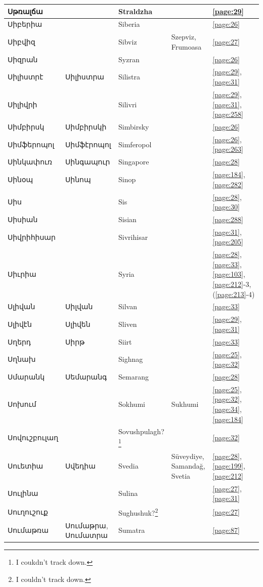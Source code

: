 \begin{center}
\begin{longtable}{|p{}|p{3cm}|p{3cm}|p{2cm}|p{3cm}|}
Սթռալճա& & Straldzha& &\ref{page:29}\\ \hline
Սիբերիա& &Siberia & &\ref{page:26}\\ \hline
Սիբվիզ& &Sibviz &Szepviz, Frumoasa &\ref{page:27}\\ \hline
Սիզրան& & Syzran& &\ref{page:26}\\ \hline
Սիլիստրէ&Սիլիստրա & Silistra& &\ref{page:29}, \ref{page:31}\\ \hline
Սիլիվրի& & Silivri& &\ref{page:29}, \ref{page:31}, \ref{page:258}\\ \hline
Սիմբիրսկ&Սիմբիրսկի &Simbirsky & &\ref{page:26}\\ \hline
Սիմֆերոպոլ& Սիմֆէրոպոլ&Simferopol & &\ref{page:26}, \ref{page:263}\\ \hline
Սինկափուռ&Սինգապուր & Singapore& &\ref{page:28}\\ \hline
Սինօպ& Սինոպ&Sinop & &\ref{page:184}, \ref{page:282}\\ \hline
Սիս& &Sis & &\ref{page:28}, \ref{page:30}\\ \hline
Սիսիան& &Sisian & &\ref{page:288}\\ \hline
Սիվրիհիսար& & Sivrihisar& &\ref{page:31}, \ref{page:205}\\ \hline
Սիւրիա& &Syria &  &\ref{page:28}, \ref{page:33}, \ref{page:103}, \ref{page:212}-3, (\ref{page:213}-4)\\ \hline
Սլիվան& Սիլվան&Silvan & &\ref{page:33}\\ \hline
Սլիվէն&   Սլիվեն &Sliven & &\ref{page:29}, \ref{page:31}\\ \hline
Սղերդ& Սիրթ& Siirt& &\ref{page:33}\\ \hline
Սղնախ& & Sighnag& &\ref{page:25}, \ref{page:32}\\ \hline
Սմարանկ& Սեմարանգ& Semarang& &\ref{page:28}\\ \hline
Սոխում& & Sokhumi& Sukhumi&\ref{page:25}, \ref{page:32}, \ref{page:34}, \ref{page:184}\\ \hline
Սովուշբուլաղ& &Sovushpulagh?\footnote{I coukdn't track down.} & &\ref{page:32}\\ \hline
Սուետիա& Սվեդիա&   Svedia&Süveydiye, Samandağ, Svetia&\ref{page:28}, \ref{page:199}, \ref{page:212}\\ \hline
Սուլինա& & Sulina& &\ref{page:27}, \ref{page:31}\\ \hline
Սուղուշուք& &Sughushuk?\footnote{I couldn't track down.} & &\ref{page:27}\\ \hline
Սումաթռա& Սումաթրա, Սումատրա & Sumatra   & &\ref{page:87}\\ \hline

\end{longtable}
\end{center}
